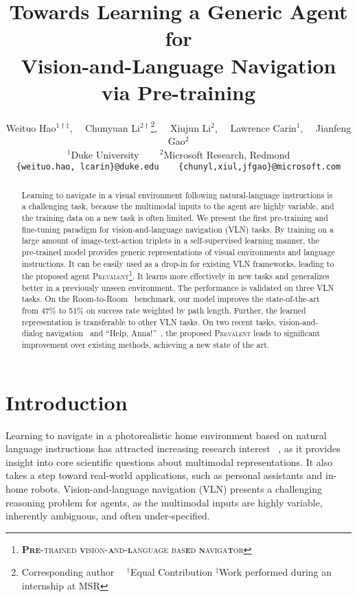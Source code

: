 \documentclass[10pt,twocolumn,letterpaper]{article}
\newcommand{\fullname}{\textsc{\textbf{Pre}-trained \textbf{v}ision-\textbf{a}nd-\textbf{l}anguage bas\textbf{e}d \textbf{n}aviga\textbf{t}or }}
\newcommand{\short}{\textsc{Prevalent}}
\begin{document}
\title{Towards Learning a Generic Agent for\\Vision-and-Language Navigation via Pre-training}

\author{
Weituo Hao$^{1 \dagger  \ddagger} $,~~ Chunyuan Li$^{2 \dagger} $\thanks{Corresponding author~~ $^{ \dagger}$Equal Contribution \hspace{1mm} $^{ \ddagger}$Work performed during an internship at MSR}, ~~Xiujun Li$^{2}$, ~~Lawrence Carin$^{1}$,  ~~Jianfeng Gao$^{2}$ \\ $^{1}$Duke University ~~~ $^{2}$Microsoft Research, Redmond \\
{\tt\small \{weituo.hao, lcarin\}@duke.edu~~~ \{chunyl,xiul,jfgao\}@microsoft.com}
}

\maketitle


\begin{abstract}
Learning to navigate in a visual environment following natural-language instructions is a challenging task, because the multimodal inputs to the agent are highly variable, and the training data on a new task is often limited. We present the first pre-training and fine-tuning paradigm for vision-and-language navigation (VLN) tasks. By training on a large amount of image-text-action triplets in a self-supervised learning manner, the pre-trained model provides generic representations of visual environments and language instructions. It can be easily used as a drop-in for existing VLN frameworks, leading to the proposed agent \short{}\footnote{\fullname}. It learns more effectively in new tasks and generalizes better in a previously unseen environment. The performance is validated on three VLN tasks. On the Room-to-Room~\cite{anderson2018vision} benchmark, our model improves the state-of-the-art from 47\% to 51\% on success rate weighted by path length. Further, the learned representation is transferable to other VLN tasks. On two recent tasks, vision-and-dialog navigation~\cite{thomason2019vision} and ``Help, Anna!''~\cite{nguyen2019help}, the proposed \short{} leads to significant improvement over existing methods, achieving a new state of the art.
\end{abstract}

\section{Introduction}
Learning to navigate in a photorealistic home environment based on natural language instructions has attracted increasing research interest ~\cite{savva2017minos,kolve2017ai2,das2018embodied,anderson2018vision,chen2019touchdown}, as it provides insight into core scientific questions about multimodal representations. It also takes a step toward real-world applications, such as personal assistants and in-home robots.
Vision-and-language navigation (VLN) presents a challenging reasoning problem for agents, as the multimodal inputs are highly variable, inherently ambiguous, and often under-specified. 
\end{document}
